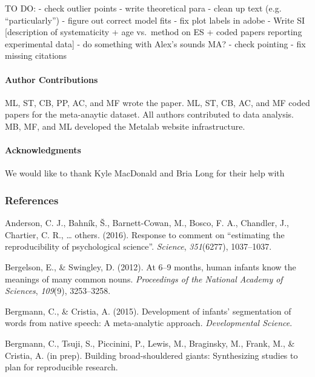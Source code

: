 \documentclass[english,floatsintext,man]{apa6}
\newcounter{author}
\begin{document}
TO DO: - check outlier points - write theoretical para - clean up text
(e.g. \enquote{particularly}) - figure out correct model fits - fix plot
labels in adobe - Write SI {[}description of systematicity + age
vs.~method on ES + coded papers reporting experimental data{]} - do
something with Alex's sounds MA? - check pointing - fix missing
citations

\paragraph{Author Contributions}\label{author-contributions}

ML, ST, CB, PP, AC, and MF wrote the paper. ML, ST, CB, AC, and MF coded
papers for the meta-anaytic dataset. All authors contributed to data
analysis. MB, MF, and ML developed the Metalab website infrastructure.

\paragraph{Acknowledgments}\label{acknowledgments}

We would like to thank Kyle MacDonald and Bria Long for their help with

\newpage

\subsubsection{References}\label{references}

\setlength{\parindent}{-0.5in} \setlength{\leftskip}{0.5in}
\setlength{\parskip}{8pt}

\hypertarget{refs}{}
\hypertarget{ref-anderson2016response}{}
Anderson, C. J., Bahník, Š., Barnett-Cowan, M., Bosco, F. A., Chandler,
J., Chartier, C. R., \ldots{} others. (2016). Response to comment on
``estimating the reproducibility of psychological science''.
\emph{Science}, \emph{351}(6277), 1037--1037.

\hypertarget{ref-bergelson2016}{}
Bergelson, E., \& Swingley, D. (2012). At 6--9 months, human infants
know the meanings of many common nouns. \emph{Proceedings of the
National Academy of Sciences}, \emph{109}(9), 3253--3258.

\hypertarget{ref-bergmann2015development}{}
Bergmann, C., \& Cristia, A. (2015). Development of infants'
segmentation of words from native speech: A meta-analytic approach.
\emph{Developmental Science}.

\hypertarget{ref-bergmanneducational}{}
Bergmann, C., Tsuji, S., Piccinini, P., Lewis, M., Braginsky, M., Frank,
M., \& Cristia, A. (in prep). Building broad-shouldered giants:
Synthesizing studies to plan for reproducible research.
\end{document}
